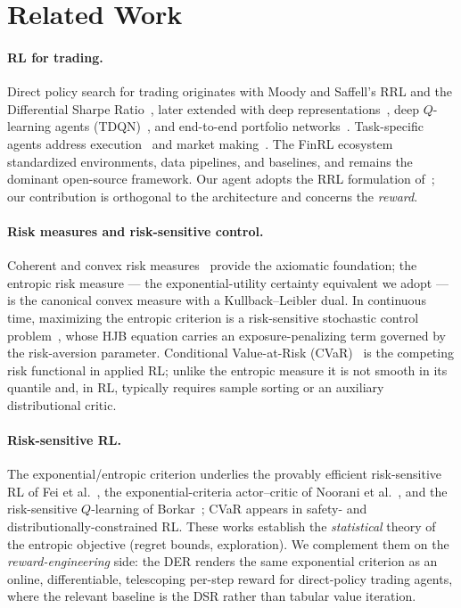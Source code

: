 \documentclass[11pt]{article}
\theoremstyle{definition}
\begin{document}
\section{Related Work}\label{sec:related}

\paragraph{RL for trading.} Direct policy search for trading originates with Moody and
Saffell's RRL and the Differential Sharpe Ratio~\cite{moody2001}, later extended with
deep representations~\cite{deng2017}, deep $Q$-learning agents (TDQN)~\cite{theate2021},
and end-to-end portfolio networks~\cite{jiang2017}. Task-specific agents address
execution~\cite{nevmyvaka2006} and market making~\cite{spooner2018}. The FinRL
ecosystem~\cite{finrl2020} standardized environments, data pipelines, and baselines,
and remains the dominant open-source framework. Our agent adopts the RRL formulation
of~\cite{moody2001}; our contribution is orthogonal to the architecture and concerns
the \emph{reward}.

\paragraph{Risk measures and risk-sensitive control.} Coherent and convex risk
measures~\cite{follmer2002} provide the axiomatic foundation; the entropic risk
measure --- the exponential-utility certainty equivalent we adopt --- is the canonical
convex measure with a Kullback--Leibler dual. In continuous time, maximizing the
entropic criterion is a risk-sensitive stochastic control
problem~\cite{bielecki1999,flemingmce1995}, whose HJB equation carries an
exposure-penalizing term governed by the risk-aversion parameter. Conditional
Value-at-Risk (CVaR)~\cite{rockafellar2000} is the competing risk functional in
applied RL; unlike the entropic measure it is not smooth in its quantile and, in RL,
typically requires sample sorting or an auxiliary distributional critic.

\paragraph{Risk-sensitive RL.} The exponential/entropic criterion underlies the
provably efficient risk-sensitive RL of Fei et al.~\cite{fei2020,fei2021}, the
exponential-criteria actor--critic of Noorani et al.~\cite{noorani2022}, and the
risk-sensitive $Q$-learning of Borkar~\cite{borkar2002}; CVaR appears in safety- and
distributionally-constrained RL. These works establish the \emph{statistical} theory
of the entropic objective (regret bounds, exploration). We complement them on the
\emph{reward-engineering} side: the DER renders the same exponential criterion as an
online, differentiable, telescoping per-step reward for direct-policy trading agents,
where the relevant baseline is the DSR rather than tabular value iteration.
\end{document}
